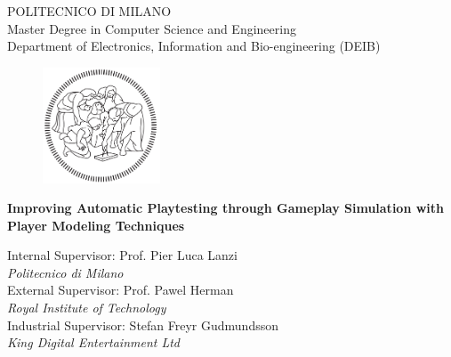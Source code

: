 \thispagestyle{empty}
\vspace*{-2cm} \bfseries{
\begin{center}
  \large
  POLITECNICO DI MILANO\\
  \normalsize
  Master Degree in Computer Science and Engineering \\
  Department of Electronics, Information and Bio-engineering (DEIB)\\
 \vspace*{0.9cm}
  \begin{figure}[htbp]
    \begin{center}
      \includegraphics[width=3.5cm]{./pictures/Logo_poli.png} %
    \end{center}
  \end{figure}
  \vspace*{0.5cm} \LARGE



  \textbf{Improving Automatic Playtesting through Gameplay Simulation with Player Modeling Techniques}\\



  \vspace*{.75truecm} \large
 \end{center}
\vspace*{1.8cm} \large
\begin{flushleft}


  Internal Supervisor: Prof. Pier Luca Lanzi \\
   \hspace*{4.32cm}     \textit{\small Politecnico di Milano} \\ \vspace*{0.3cm}
  External Supervisor: Prof. Pawel Herman \\
   \hspace*{4.36cm}     \textit{\small Royal Institute of Technology} \\ \vspace*{0.3cm}
  Industrial Supervisor: Stefan Freyr Gudmundsson \\
   \hspace*{4.5cm}     \textit{\small King Digital Entertainment Ltd}


\end{flushleft}}
